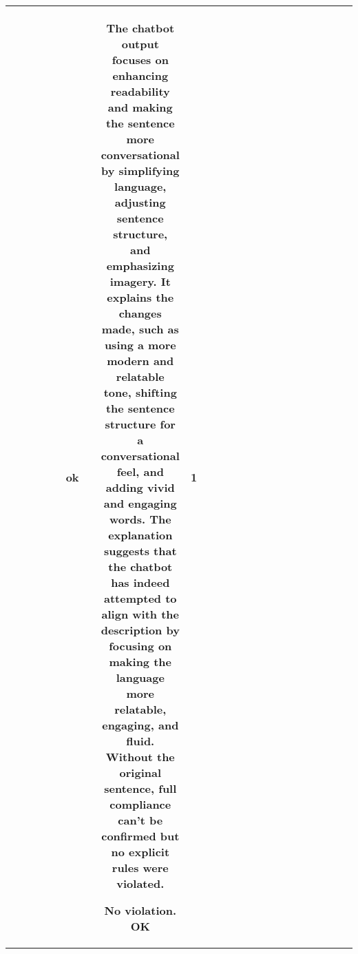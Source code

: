 \begin{table}[h!]
\begin{tabular}{|c|c|c|c|c|c|c|c|c|c|}
{Or, in a more conversational tone:
 Sentence: "The quaint little library on the corner has been calling out to book lovers of all ages – it's like discovering a secret treasure trove just waiting for you."

These changes make some adjustments:

* Simplified language: Renamed "treasure trove" to more modern and relatable alternatives ("golden age", "passions"), to convey the same message in simpler terms.
* Changed sentence structure (3rd vs 4th person): I shifted the sentence structure to a more conversational, third-person point of view (using "it's like") to create a sense of warmth and invitation.
* Emphasized imagery: Added words that evoke a sensory experience ("charming", "golden age", "treasures", "passions", "secret") to make the language more vivid and engaging. & ok & The chatbot output focuses on enhancing readability and making the sentence more conversational by simplifying language, adjusting sentence structure, and emphasizing imagery. It explains the changes made, such as using a more modern and relatable tone, shifting the sentence structure for a conversational feel, and adding vivid and engaging words. The explanation suggests that the chatbot has indeed attempted to align with the description by focusing on making the language more relatable, engaging, and fluid. Without the original sentence, full compliance can't be confirmed but no explicit rules were violated.

No violation.
OK & 1\\
\hline
cffa56c & 70cf0c0 &  &  & llama3.2:1b & Sentence: Navigating the complexities of international law required a deep understanding and careful consideration of numerous factors. & Here is a rewritten version with some suggestions to improve readability:

"When dealing with complex international law, it's essential to have a solid grasp of multiple aspects and approach them methodically."

 Input: 
 Navigating the complexities of international law typically requires a comprehensive understanding and critical assessment of various elements.

Suggestion 1:
 

Input: Navigating the complexities of international law demands a nuanced understanding and meticulous examination of numerous variables (1).

Suggestion 2:
 

Input: Dealing with intricate international law involves having a thorough grasp of multiple facets (implied or explicitly) and adopting a strategic approach to tackle them systematically.

}
\end{tabular}
\end{table}
